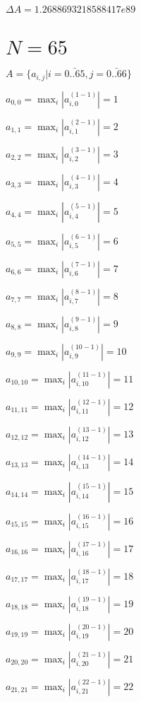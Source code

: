 \documentclass[a4paper,12pt]{article}
\begin{document}
$\Delta A = 1.2688693218588417e89$



\section{ $N = 65$ }
$A = \{ a _{ i, j } | i = \bar { 0..65 }, j = \bar { 0..66 } \}$

$a _{ 0, 0 } =  \max _i |a _{ i, 0 } ^{ (1 - 1) } | = 1$

$a _{ 1, 1 } =  \max _i |a _{ i, 1 } ^{ (2 - 1) } | = 2$

$a _{ 2, 2 } =  \max _i |a _{ i, 2 } ^{ (3 - 1) } | = 3$

$a _{ 3, 3 } =  \max _i |a _{ i, 3 } ^{ (4 - 1) } | = 4$

$a _{ 4, 4 } =  \max _i |a _{ i, 4 } ^{ (5 - 1) } | = 5$

$a _{ 5, 5 } =  \max _i |a _{ i, 5 } ^{ (6 - 1) } | = 6$

$a _{ 6, 6 } =  \max _i |a _{ i, 6 } ^{ (7 - 1) } | = 7$

$a _{ 7, 7 } =  \max _i |a _{ i, 7 } ^{ (8 - 1) } | = 8$

$a _{ 8, 8 } =  \max _i |a _{ i, 8 } ^{ (9 - 1) } | = 9$

$a _{ 9, 9 } =  \max _i |a _{ i, 9 } ^{ (10 - 1) } | = 10$

$a _{ 10, 10 } =  \max _i |a _{ i, 10 } ^{ (11 - 1) } | = 11$

$a _{ 11, 11 } =  \max _i |a _{ i, 11 } ^{ (12 - 1) } | = 12$

$a _{ 12, 12 } =  \max _i |a _{ i, 12 } ^{ (13 - 1) } | = 13$

$a _{ 13, 13 } =  \max _i |a _{ i, 13 } ^{ (14 - 1) } | = 14$

$a _{ 14, 14 } =  \max _i |a _{ i, 14 } ^{ (15 - 1) } | = 15$

$a _{ 15, 15 } =  \max _i |a _{ i, 15 } ^{ (16 - 1) } | = 16$

$a _{ 16, 16 } =  \max _i |a _{ i, 16 } ^{ (17 - 1) } | = 17$

$a _{ 17, 17 } =  \max _i |a _{ i, 17 } ^{ (18 - 1) } | = 18$

$a _{ 18, 18 } =  \max _i |a _{ i, 18 } ^{ (19 - 1) } | = 19$

$a _{ 19, 19 } =  \max _i |a _{ i, 19 } ^{ (20 - 1) } | = 20$

$a _{ 20, 20 } =  \max _i |a _{ i, 20 } ^{ (21 - 1) } | = 21$

$a _{ 21, 21 } =  \max _i |a _{ i, 21 } ^{ (22 - 1) } | = 22$
\end{document}

